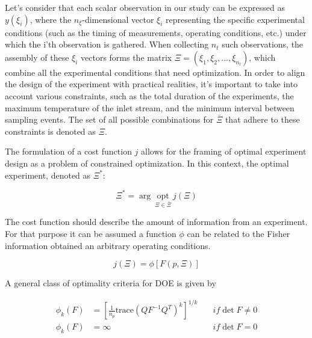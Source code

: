 \documentclass[]{scrartcl}
\begin{document}
Let's consider that each scalar observation in our study can be expressed as $y(\xi_i)$, where the $n_\xi$-dimensional vector $\xi_i$ representing the specific experimental conditions (such as the timing of measurements, operating conditions, etc.) under which the i'th observation is gathered. When collecting $n_t$ such observations, the assembly of these $\xi_i$ vectors forms the matrix $\Xi = (\xi_1, \xi_2,..., \xi_{n_t})$, which combine all the experimental conditions that need optimization. In order to align the design of the experiment with practical realities, it's important to take into account various constraints, such as the total duration of the experiments, the maximum temperature of the inlet stream, and the minimum interval between sampling events. The set of all possible combinations for $\bar{\Xi}$ that adhere to these constraints is denoted as $\Xi$.


The formulation of a cost function $j$ allows for the framing of optimal experiment design as a problem of constrained optimization. In this context, the optimal experiment, denoted as $\Xi^*$:

\begin{equation}
	\Xi^* = \arg~\underset{\Xi \in \bar{\Xi}}{\text{opt}}~j\left(\Xi\right)
\end{equation}

The cost function should describe the amount of information from an experiment. For that purpose it can be assumed a function $\phi$ can be related to the Fisher information obtained an arbitrary operating conditions.

\begin{equation}
	j(\Xi) = \phi\left[ F(p, \Xi) \right]
\end{equation}


A general class of optimality criteria for DOE is given by

\begin{align}
	\phi_k(F) &= \left[\frac{1}{n_p} \text{trace}\left( QF^{-1}Q^T \right)^k \right]^{1/k} \quad &if \det F \neq 0 \nonumber \\
	\phi_k(F) &= \infty \quad &if \det F = 0
\end{align}
\end{document}
